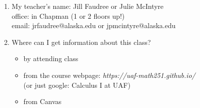 \documentclass[11pt,fleqn]{article}
\begin{document}
\renewcommand{\headrulewidth}{0pt}
\newcommand{\blank}[1]{\rule{#1}{0.75pt}}
\renewcommand{\d}{\displaystyle}
\vspace*{-0.7in}
\begin{center}
  \large {}
\end{center}


\begin{enumerate}
\item My teacher's name: Jill Faudree or Julie McIntyre\\ 
office: in Chapman (1 or 2 floors up!)\\ 
email:  jrfaudree@alaska.edu or jpmcintyre@alaska.edu\
\item Where can I get information about this class?\\
\begin{itemize}
\item by attending class
\item from the course webpage: \textit{https://uaf-math251.github.io/} \\(or just google: Calculus I at UAF)
\item from Canvas
\end{itemize}


\end{enumerate}
\end{document}
